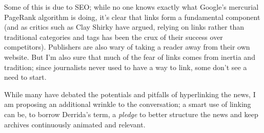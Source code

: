 
Some of this is due to SEO; while no one knows exactly what Google's mercurial PageRank algorithm is doing, it's clear that links form a fundamental component (and as critics such as Clay Shirky have argued, relying on links rather than traditional categories and tags has been the crux of their success over competitors).\autocite{} Publishers are also wary of taking a reader away from their own website. But I'm also sure that much of the fear of links comes from inertia and tradition; since journalists never used to have a way to link, some don't see a need to start.

While many have debated the potentials and pitfalls of hyperlinking the news, I am proposing an additional wrinkle to the conversation; a smart use of linking can be, to borrow Derrida's term, a \emph{pledge} to better structure the news and keep archives continuously animated and relevant.






